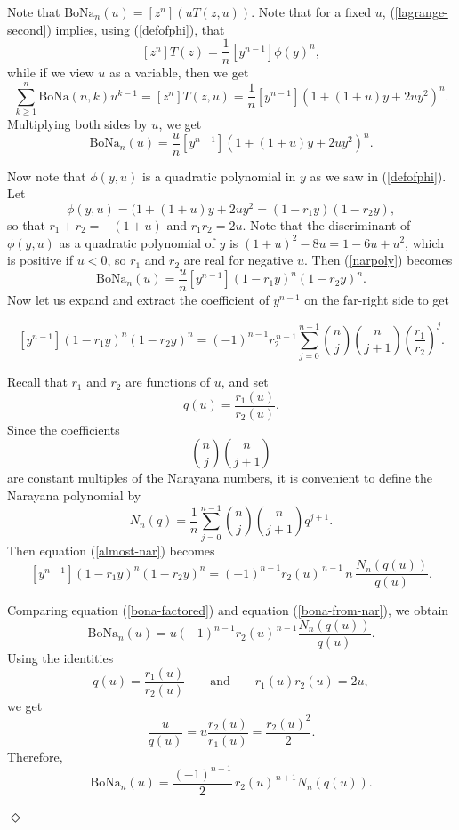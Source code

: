 \documentclass[11pt]{article}
\newcommand{\bona}{\mathrm{BoNa}}
\newcommand{\qed}{\mbox{$\Diamond$}\vspace{\baselineskip}}
\newenvironment{proof}{\noindent {\bf Proof:}}{{\qed}}
\begin{document}
\begin{proof} 
Note that $\bona_n(u)=[z^n](uT(z,u))$. Note that for a fixed $u$, (\ref{lagrange-second}) implies, using (\ref{defofphi}), that
\[[z^n]T(z) =\frac{1}{n}[y^{n-1}]\phi(y)^n,\] while if we view $u$ as a variable, then we get
\[\sum_{k\geq 1}^n \bona(n,k) u^{k-1}=[z^n]T(z,u)=\frac{1}{n}[y^{n-1}]\left(1+(1+u)y+2uy^2\right)^n.\]
Multiplying both sides by $u$, we get
\begin{equation} \label{narpoly} \bona_n(u)= \frac{u}{n}[y^{n-1}]\left(1+(1+u)y+2uy^2\right)^n .\end{equation}

Now note that $\phi(y,u)$ is a quadratic polynomial in $y$ as we saw in (\ref{defofphi}). Let
\begin{equation} \label{defrs} \phi(y,u)=(1+(1+u)y+2uy^2=(1-r_1y)(1-r_2y),\end{equation} so that $r_1+r_2=-(1+u)$ and $r_1r_2=2u$.
Note that the discriminant of $\phi(y,u)$ as a quadratic polynomial of $y$ is
$(1+u)^2-8u=1-6u+u^2$, which is positive if $u<0$, so $r_1$ and $r_2$ are real for negative $u$. 
Then (\ref{narpoly}) becomes
\begin{equation} \label{bona-factored} \bona_n(u)=\frac{u}{n} [y^{n-1}](1-r_1y)^n(1-r_2y)^n.\end{equation}
Now let us expand and extract the coefficient of $y^{n-1}$ on the far-right side to get


\begin{equation} \label{almost-nar}
[y^{n-1}](1-r_1y)^n(1-r_2y)^n
=
(-1)^{n-1} r_2^{\,n-1}
\sum_{j=0}^{n-1}
\binom{n}{j}\binom{n}{j+1}
\left(\frac{r_1}{r_2}\right)^j.
\end{equation}


Recall that \(r_1\) and \(r_2\) are functions of \(u\), and set
\[
q(u)=\frac{r_1(u)}{r_2(u)}.
\]
Since the coefficients
\[
\binom{n}{j}\binom{n}{j+1}
\]
are constant multiples of the Narayana numbers, it is convenient to define the Narayana polynomial
by
\begin{equation}\label{narayana-poly}
N_n(q)=\frac{1}{n}\sum_{j=0}^{n-1}\binom{n}{j}\binom{n}{j+1}q^{j+1}.
\end{equation}
Then equation (\ref{almost-nar})  becomes
\begin{equation}  \label{bona-from-nar}
[y^{n-1}](1-r_1y)^n(1-r_2y)^n
=
(-1)^{n-1}r_2(u)^{\,n-1}\,n\,\frac{N_n(q(u))}{q(u)}.
\end{equation}


Comparing equation (\ref{bona-factored}) and equation (\ref{bona-from-nar}), we obtain
\[
\mathrm{BoNa}_n(u)
=
u(-1)^{n-1}r_2(u)^{\,n-1}\frac{N_n(q(u))}{q(u)}.
\]
Using the identities
\[
q(u)=\frac{r_1(u)}{r_2(u)}
\qquad\text{and}\qquad
r_1(u)r_2(u)=2u,
\]
we get
\[
\frac{u}{q(u)}
=
u\frac{r_2(u)}{r_1(u)}
=
\frac{r_2(u)^2}{2}.
\]
Therefore,
\begin{equation}   \label{bona-nar-explicit}
\mathrm{BoNa}_n(u)
=
\frac{(-1)^{n-1}}{2}\,r_2(u)^{\,n+1}N_n(q(u)).
\end{equation}


\end{proof}
\end{document}
